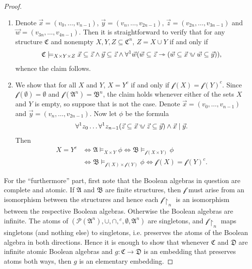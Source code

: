 \documentclass[a4paper]{amsart}
\theoremstyle{definition}
\theoremstyle{remark}
\renewcommand{\restriction}{ {\upharpoonright} }
\newcommand{\A}{\mathcal{A}}
\newcommand{\B}{\mathcal{B}}
\newcommand{\C}{\mathcal{C}}
\newcommand{\D}{\mathcal{D}}
\newcommand{\vx}{\vec{x}}
\newcommand{\vy}{\vec{y}}
\newcommand{\vz}{\vec{z}}
\DeclareMathOperator{\Pow}{\wp}
\newcommand\ivee{\mathrel{\rotatebox[origin=c]{270}{$\geqslant$}}}
\newcommand{\forallone}{\forall^1}
\theoremstyle{definition}
\renewcommand{\A}{\mathfrak{A}}
\renewcommand{\B}{\mathfrak{B}}
\renewcommand{\C}{\mathfrak{C}}
\renewcommand{\D}{\mathfrak{D}}
\newcommand{\wcimp}{\rightarrowtriangle}
\newcommand{\f}{\mathcal{f}}
\renewcommand{\Pow}{\mathcal{P}}
\begin{document}
\begin{proof}\quad
    \begin{enumerate}
        \item Denote $\vx = (v_0,\dots,v_{n-1})$, $\vy = (v_n,\dots,v_{2n-1})$, $\vz = (v_{2n},\dots,v_{3n-1})$ and $\vec w = (v_{3n},\dots,v_{4n-1})$. Then it is straightforward to verify that for any structure $\C$ and nonempty $X,Y,Z\subseteq\C^n$, $Z = X\cup Y$ if and only if
        \[
            \C\models_{X\times Y\times Z} \vx\subseteq\vz \land \vy\subseteq\vz \land \forallone\vec w (\vec w\subseteq\vz \wcimp (\vec w\subseteq\vx \ivee \vec w\subseteq\vy)),
        \]
        whence the claim follows.

        \item We show that for all $X$ and $Y$, $X = Y^c$ if and only if $\f(X) = \f(Y)^c$. Since $\f(\emptyset) = \emptyset$ and $\f(\A^n) = \B^n$, the claim holds whenever either of the sets $X$ and $Y$ is empty, so suppose that is not the case. Denote $\vx = (v_0,\dots,v_{n-1})$ and $\vy = (v_n,\dots,v_{2n-1})$. Now let $\phi$ be the formula
        \[
            \forallone z_0\dots\forallone z_{n-1} ( \vz\subseteq\vx \ivee\vz\subseteq\vy ) \land \vx\mid\vy.
        \]
        Then
        \begin{align*}
            X = Y^c &\iff \A\models_{X\times Y}\phi \iff \B\models_{\f(X\times Y)}\phi \\
            &\iff \B\models_{\f(X)\times\f(Y)}\phi \iff \f(X) = \f(Y)^c.
        \end{align*}
    \end{enumerate}
    For the ``furthermore'' part, first note that the Boolean algebras in question are complete and atomic. If $\A$ and $\B$ are finite structures, then $\f$ must arise from an isomorphism between the structures and hence each $\f\restriction_n$ is an isomorphism between the respective Boolean algebras. Otherwise the Boolean algebras are infinite. The atoms of $(\Pow(\A^n),\cup,\cap,{}^c,\emptyset,\A^n)$ are singletons, and $\f\restriction_n$ maps singletons (and nothing else) to singletons, i.e. preserves the atoms of the Boolean algebra in both directions. Hence it is enough to show that whenever $\C$ and $\D$ are infinite atomic Boolean algebras and $g\colon\C\to\D$ is an embedding that preserves atoms both ways, then $g$ is an elementary embedding.


\end{proof}
\end{document}
